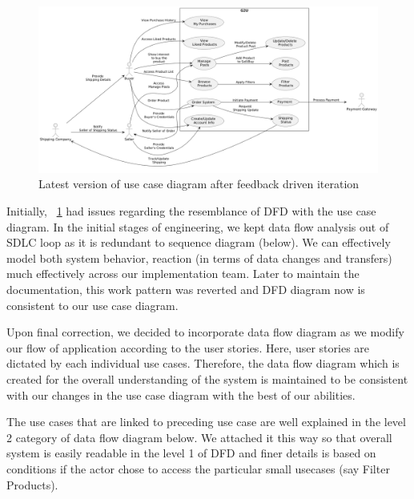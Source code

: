 \begin{figure}[!h]
	\centering
	\includegraphics[width=1\textwidth]{chapters/ch-03/00_usecase.png} %
	\caption{Latest version of use case diagram after feedback driven iteration}
	\label{fig:usecase} %
\end{figure}


Initially, ~\ref{fig:usecase} had issues regarding the resemblance of DFD with the use case diagram. In the initial stages of engineering, we kept data flow analysis out of SDLC loop as it is redundant to sequence diagram (below). We can effectively model both system behavior, reaction (in terms of data changes and transfers) much effectively across our implementation team. Later to maintain the documentation, this work pattern was reverted and DFD diagram now is consistent to our use case diagram.

Upon final correction, we decided to incorporate data flow diagram as we modify our flow of application according to the user stories. Here, user stories are dictated by each individual use cases. Therefore, the data flow diagram which is created for the overall understanding of the system is maintained to be consistent with our changes in the use case diagram with the best of our abilities.

The use cases that are linked to preceding use case are well explained in the level 2 category of data flow diagram below. We attached it this way so that overall system is easily readable in the level 1 of DFD and finer details is based on conditions if the actor chose to access the particular small usecases (say Filter Products).


